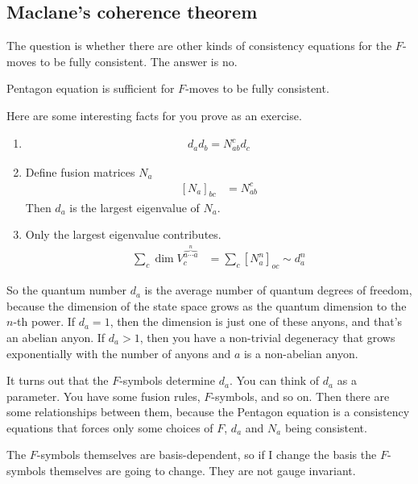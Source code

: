 \subsection{Maclane's coherence theorem}
The question is whether there are other kinds of consistency equations for the
$F$-moves to be fully consistent.
The answer is no.
\begin{theorem}
    Pentagon equation is sufficient for $F$-moves to be fully consistent.
\end{theorem}
Here are some interesting facts for you prove as an exercise.
\begin{enumerate}
    \item
    \begin{align}
        d_a d_b = N_{ab}^c d_c
    \end{align}
    \item Define fusion matrices $N_a$
    \begin{align}
        \left[ N_a \right]_{bc} &= N_{ab}^{c}
    \end{align}
    Then $d_a$ is the largest eigenvalue of $N_a$.
    \item Only the largest eigenvalue contributes.
        \begin{align}
            \sum_{c} \dim V_c^{\overbrace{a\cdots a}^{n}}
            &=
            \sum_{c} \left[ N_a^n \right]_{oc}
            \sim d_a^n
        \end{align}
\end{enumerate}
So the quantum number $d_a$ is the average number of quantum degrees of freedom,
because the dimension of the state space grows as the quantum dimension to the
$n$-th power.
If $d_a=1$,
then the dimension is just one of these anyons,
and that's an abelian anyon.
If $d_a>1$,
then you have a non-trivial degeneracy that grows exponentially with the number
of anyons and $a$ is a non-abelian anyon.

It turns out that the $F$-symbols determine $d_a$.
You can think of $d_a$ as a parameter.
You have some fusion rules,
$F$-symbols,
and so on.
Then there are some relationships between them,
because the Pentagon equation is a consistency equations that forces only some
choices of $F$, $d_a$ and $N_a$ being consistent.

The $F$-symbols themselves are basis-dependent,
so if I change the basis the $F$-symbols themselves are going to change.
They are not gauge invariant.

